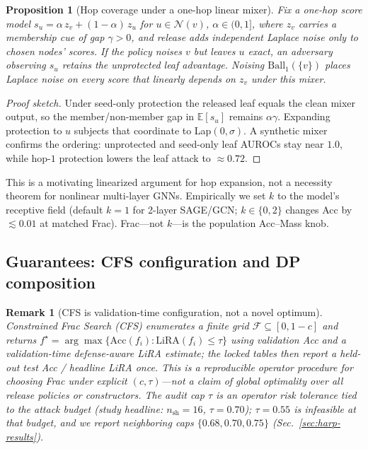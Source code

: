 \documentclass[conference]{IEEEtran}
\newtheorem{remark}{Remark}
\newtheorem{proposition}{Proposition}
\begin{document}
\begin{proposition}[Hop coverage under a one-hop linear mixer]
\label{thm:hop-necessary}
Fix a one-hop score model $s_u = \alpha\, z_v + (1-\alpha)\, z_u$ for $u\in\mathcal{N}(v)$, $\alpha\in(0,1]$, where $z_v$ carries a membership cue of gap $\gamma>0$, and release adds independent Laplace noise only to chosen nodes' scores.
If the policy noises $v$ but leaves $u$ exact, an adversary observing $s_u$ retains the unprotected leaf advantage.
Noising $\mathrm{Ball}_1(\{v\})$ places Laplace noise on every score that linearly depends on $z_v$ under this mixer.
\end{proposition}
\begin{proof}[Proof sketch]
Under seed-only protection the released leaf equals the clean mixer output, so the member/non-member gap in $\mathbb{E}[s_u]$ remains $\alpha\gamma$.
Expanding protection to $u$ subjects that coordinate to Lap$(0,\sigma)$.
A synthetic mixer confirms the ordering: unprotected and seed-only leaf AUROCs stay near $1.0$, while hop-$1$ protection lowers the leaf attack to ${\approx}0.72$.
\end{proof}
This is a motivating linearized argument for hop expansion, not a necessity theorem for nonlinear multi-layer GNNs.
Empirically we set $k$ to the model's receptive field (default $k{=}1$ for 2-layer SAGE/GCN; $k{\in}\{0,2\}$ changes Acc by ${\lesssim}0.01$ at matched Frac).
Frac---not $k$---is the population Acc--Mass knob.

\subsection{Guarantees: CFS configuration and DP composition}
\label{sec:guarantees}
\begin{remark}[CFS is validation-time configuration, not a novel optimum]
\label{thm:cfs-opt}
Constrained Frac Search (CFS) enumerates a finite grid $\mathcal{F}\subseteq[0,1-c]$ and returns $f^\star=\arg\max\{\mathrm{Acc}(f_i):\mathrm{LiRA}(f_i)\le\tau\}$ using \emph{validation} Acc and a validation-time defense-aware LiRA estimate; the locked tables then report a held-out test Acc / headline LiRA once.
This is a reproducible operator procedure for choosing Frac under explicit $(c,\tau)$---not a claim of global optimality over all release policies or constructors.
The audit cap $\tau$ is an operator risk tolerance tied to the attack budget (study headline: $n_{\mathrm{sh}}{=}16$, $\tau{=}0.70$); $\tau{=}0.55$ is infeasible at that budget, and we report neighboring caps $\{0.68,0.70,0.75\}$ (Sec.~\ref{sec:harp-results}).
\end{remark}
\end{document}
